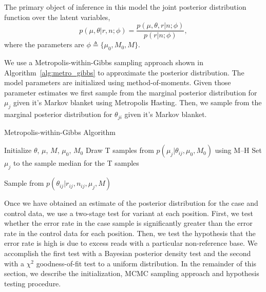 \documentclass[11pt,reqno]{amsart}
\begin{document}
The primary object of inference in this model the joint posterior distribution function over the latent variables,
\begin{equation}
	p(\mu, \theta | r, n; \phi)  = \frac{ p(\mu, \theta, r | n; \phi) } {p ( r | n; \phi)},
\end{equation}
where the parameters are $\phi \triangleq \{\mu_0, M_0, M\}$.

We use a Metropolis-within-Gibbs sampling approach shown in Algorithm~\ref{alg:metro_gibbs} to approximate the posterior distribution. The model parameters are initialized using method-of-moments. Given those parameter estimates we first sample from the marginal posterior distribution for $\mu_j$ given it's Markov blanket using Metropolis Hasting. Then, we sample from the marginal posterior distribution for $\theta_{ji}$ given it's Markov blanket.

\begin{algorithm}[ht]
\caption{Metropolis-within-Gibbs Algorithm}
\label{alg:metro_gibbs}
\begin{algorithmic}[1]

\State Initialize $\theta$, $\mu$, $M$, $\mu_0$, $M_0$
\Repeat
{} 
  \State Draw T samples from $p \left( \mu_j |\theta_{ij},\mu_0,M_0\right)$ using M--H
  \State Set $\mu_j$ to the sample median for the T samples
  
  
   
	\State Sample from $p \left( \theta_{ij} |r_{ij},n_{ij},\mu_j,M \right)$
  \EndFor

\EndFor
{}
\end{algorithmic}
\end{algorithm}

Once we have obtained an estimate of the posterior distribution for the case and control data, we use a two-stage test for variant at each position. First, we test whether the error rate in the case sample is significantly greater than the error rate in the control data for each position. Then, we test the hypothesis that the error rate is high is due to excess reads with a particular non-reference base. We accomplish the first test with a Bayesian posterior density test and the second with a $\chi^2$ goodness-of-fit test to a uniform distribution. In the remainder of this section, we describe the initialization, MCMC sampling approach and hypothesis testing procedure.

\end{document}
